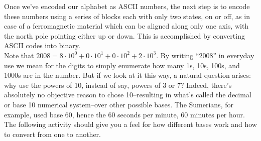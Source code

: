  \vspace{0.2cm}

Once we've encoded our alphabet as ASCII numbers, the next step is to encode these numbers using a series of blocks each with only two states, on or off, as in case of a ferromagnetic material which can be aligned along only one axis, with the north pole pointing either up or down. This is accomplished by converting ASCII codes into binary. \\

Note that $2008=8\cdot 10^0+0\cdot 10^1+0\cdot 10^2+2\cdot 10^3$. By writing ``2008'' in everyday use we mean for the digits to simply enumerate how many 1s, 10s, 100s, and 1000s are in the number. But if we look at it this way, a natural question arises: why use the powers of 10, instead of say, powers of 3 or 7? Indeed, there's absolutely no objective reason to chose 10--resulting in what's called the decimal or base 10 numerical system--over other possible bases. The Sumerians, for example, used base 60, hence the 60 seconds per minute, 60 minutes per hour. The following activity should give you a feel for how different bases work and how to convert from one to another.


